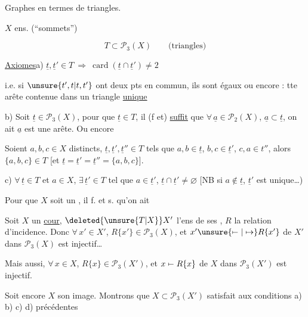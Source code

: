 Graphes  en termes de triangles.

$X$ ens. (``sommets'')

\[T\subset\mathcal P_3(X)\qquad\text{(triangles)}\]

\uline{Axiomes}\quad a) $\underline t,\underline t'\in T\ \Longrightarrow\ \operatorname{card}(\underline t\cap\underline t')\ne2$

i.e. si $\unsure{t',t|t,t'}$ ont deux pts en commun, ils sont égaux ou encore : tte arête contenue dans un triangle \uline{unique}

b) Soit $\underline t\in\mathcal P_3(X)$, pour que $\underline t\in T$, il (f et) \uline{suffit} que $\forall\,\underline a\in\mathcal P_2(X)$, $\underline a\subset\underline t$, on ait $\underline a$ est une arête. Ou encore

Soient $a,b,c\in X$ distincts,  $\underline t,\underline t',\underline t''\in T$ tels que $a,b\in\underline t$, $b,c\in\underline t'$, $c,a\in t''$, alors $\{a,b,c\}\in T$ [et $\underline t=\underline t'=\underline t''=\{a,b,c\}$].

c) $\forall\,\underline t\in T$ et $a\in X$, $\exists\,\underline t'\in T$ tel que $a\in\underline t'$, $\underline t\cap\underline t'\ne\varnothing$ [NB si $a\notin\underline t$, $\underline t'$ est unique\ldots)

Pour que $X$ soit un \uline{}, il f. et s. qu'on ait


Soit $X$ un \uline{cour}, $\deleted{\unsure{T|X}}X'$ l'ens de ses , $R$ la relation d'incidence. Donc $\forall\,x'\in X'$, $R\{x'\}\in\mathcal P_3(X)$, et $x'\unsure{\mapstochar\relbar|\mapsto}R\{x'\}$ de $X'$ dans $\mathcal P_3(X)$ est injectif\ldots

Mais aussi, $\forall\,x\in X$, $R\{x\}\in\mathcal P_3(X')$, et $x\mapstochar\relbar R\{x\}$ de $X$ dans $\mathcal P_3(X')$ est injectif.

Soit encore $X$ son image. Montrons que $X\subset\mathcal P_3(X')$ satisfait aux conditions a) b) c) d) précédentes
